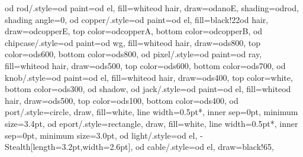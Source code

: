 {  od rod/.style={od paint={od el, fill=white}{od hair, draw=odanoE, shading=odrod, shading angle=0}},     %
  od copper/.style={od paint={od el, fill=black!22}{od hair, draw=odcopperE, top color=odcopperA, bottom color=odcopperB}},
  od chipcase/.style={od paint={od wg, fill=white}{od hair, draw=ods800, top color=ods600, bottom color=ods800}},
  od pixel/.style={od paint={od ray, fill=white}{od hair, draw=ods500, top color=ods600, bottom color=ods700}},
  od knob/.style={od paint={od el, fill=white}{od hair, draw=ods400, top color=white, bottom color=ods300, od shadow}},
  od jack/.style={od paint={od el, fill=white}{od hair, draw=ods500, top color=ods100, bottom color=ods400}},
  od port/.style={circle, draw, fill=white, line width=0.5pt*\odls, inner sep=0pt, minimum size=3.4pt},
  od eport/.style={rectangle, draw, fill=white, line width=0.5pt*\odls, inner sep=0pt, minimum size=3.0pt},
  od light/.style={od el, -{Stealth[length=3.2pt,width=2.6pt]}},
  od cable/.style={od el, draw=black!65},                             %
}
\def\odmw{0.12}   %

\gdef\odportlist{}
\newcommand\odport[3][optical]{%
  \coordinate (-#2) at (#3);
  \ifodshowports
    \def\odtmpa{#1}\def\odtmpb{electrical}\def\odtmpc{thermal}\def\odtmpd{hub}%
    \ifx\odtmpa\odtmpb \node[od eport] at (#3) {};%
    \else\ifx\odtmpa\odtmpc \node[od eport] at (#3) {};%
    \else\ifx\odtmpa\odtmpd
    \else \node[od port] at (#3) {};\fi\fi\fi
  \fi
  \xdef\odportlist{\odportlist\ifx\odportlist\empty\else,\fi#2/#1}%
}

\newwrite\odout
\newcommand\odwriteports[1]{%
  \foreach \odpname/\odpkind in \odportlist {%
    \path (#1-\odpname); \pgfgetlastxy{\odpx}{\odpy}%
    \immediate\write\odout{port \odpname\space\odpkind\space\odpx\space\odpy}}%
}
\newcommand\odwritebbox{%
  \path (current bounding box.south west); \pgfgetlastxy{\odpx}{\odpy}%
  \immediate\write\odout{sw \odpx\space\odpy}%
  \path (current bounding box.north east); \pgfgetlastxy{\odpx}{\odpy}%
  \immediate\write\odout{ne \odpx\space\odpy}%
}
